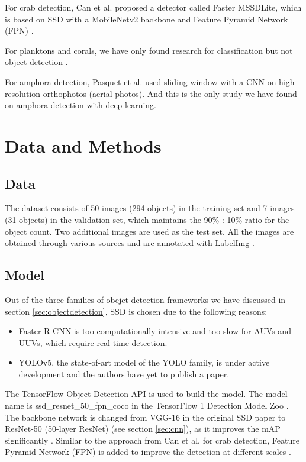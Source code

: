 \documentclass[a4paper, 11pt, oneside]{article}
\begin{document}
  For crab detection, Can et al. \cite{cao2020real} proposed a detector called Faster MSSDLite, which is based on SSD with
  a MobileNetv2 backbone and Feature Pyramid Network (FPN) \cite{lin2017feature}.

  For planktons and corals, we have only found research for classification but not object detection
  \cite{qin2015underwater, moniruzzaman2017deep}.

  For amphora detection, Pasquet et al. \cite{mccarthy20193d, pasquet2017amphora} used sliding window with a CNN on
  high-resolution orthophotos (aerial photos). And this is the only study we have found on amphora detection with deep
  learning.

  \section{Data and Methods}

  \subsection{Data}

  The dataset consists of 50 images (294 objects) in the training set and 7 images (31 objects) in the validation set,
  which maintains the 90\% : 10\% ratio for the object count. Two additional images are used as the test set. All the
  images are obtained through various sources
  \cite{googleimages, scuba, itinari, whoi, phoenician, auscape, hakai, groplan, ionian, sanisera} and are annotated
  with LabelImg \cite{labelimg}.

  \subsection{Model}

  Out of the three families of obejct detection frameworks we have discussed in section \ref{sec:objectdetection}, SSD is
  chosen due to the following reasons:

  \begin{itemize}
    \item Faster R-CNN is too computationally intensive and too slow for AUVs and UUVs, which require real-time detection.
    \item YOLOv5, the state-of-art model of the YOLO family, is under active development and the authors have yet to
    publish a paper.
  \end{itemize}

  The TensorFlow Object Detection API \cite{huang2017speed, tfobjectdetection} is used to build the model. The model name
  is ssd\_resnet\_50\_fpn\_coco in the TensorFlow 1 Detection Model Zoo \cite{tf1detectionmodelzoo}. The backbone
  network is changed from VGG-16 in the original SSD paper to ResNet-50 (50-layer ResNet)
  (see section \ref{sec:cnn}), as it improves the mAP significantly \cite{he2016deep}. Similar to the approach
  from Can et al. \cite{cao2020real} for crab detection, Feature Pyramid Network (FPN) is added to improve the detection at
  different scales \cite{lin2017feature}.
\end{document}
